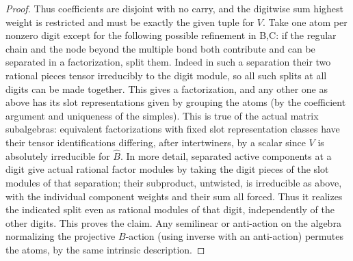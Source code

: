 \begin{proof}
Thus coefficients are disjoint with no carry, and the digitwise sum highest weight is restricted and must be exactly the given tuple for \(V\). Take one atom per nonzero digit except for the following possible refinement in B,C: if the regular chain and the node beyond the multiple bond both contribute and can be separated in a factorization, split them. Indeed in such a separation their two rational pieces tensor irreducibly to the digit module, so all such splits at all digits can be made together. This gives a factorization, and any other one as above has its slot representations given by grouping the atoms (by the coefficient argument and uniqueness of the simples). This is true of the actual matrix subalgebras: equivalent factorizations with fixed slot representation classes have their tensor identifications differing, after intertwiners, by a scalar since \(V\) is absolutely irreducible for \(\widehat B\). In more detail, separated active components at a digit give actual rational factor modules by taking the digit pieces of the slot modules of that separation; their subproduct, untwisted, is irreducible as above, with the individual component weights and their sum all forced. Thus it realizes the indicated split even as rational modules of that digit, independently of the other digits. This proves the claim. Any semilinear or anti-action on the algebra normalizing the projective \(B\)-action (using inverse with an anti-action) permutes the atoms, by the same intrinsic description.
\end{proof}

